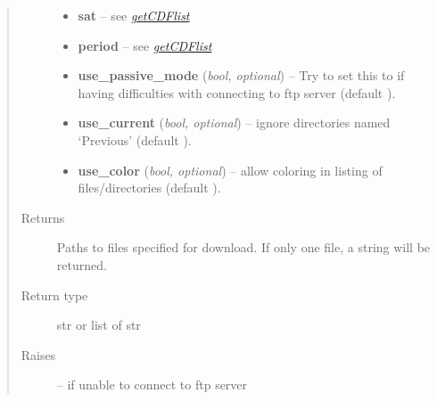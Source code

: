 \documentclass[letterpaper,10pt,english]{sphinxhowto}
\begin{document}
\begin{fulllineitems}
\begin{quote}
\begin{description}
\begin{itemize}
\item {} 
\textbf{sat} --
see {\hyperref[swtools_doc:getcdflist]{\emph{getCDFlist}}}

\item {} 
\textbf{period} --
see {\hyperref[swtools_doc:getcdflist]{\emph{getCDFlist}}}

\item {} 
\textbf{use\_passive\_mode} (\emph{bool, optional}) --
Try to set this to  if having difficulties with
connecting to ftp server (default ).

\item {} 
\textbf{use\_current} (\emph{bool, optional}) --
ignore directories named `Previous' (default ).

\item {} 
\textbf{use\_color} (\emph{bool, optional}) --
allow coloring in listing of files/directories
(default ).

\end{itemize}

\item[{Returns}] \leavevmode
Paths to files specified for download. If only one file, a string
will be returned.

\item[{Return type}] \leavevmode
str or list of str

\item[{Raises}] \leavevmode
{} --
if unable to connect to ftp server

\end{description}\end{quote}

\end{fulllineitems}

\end{document}
